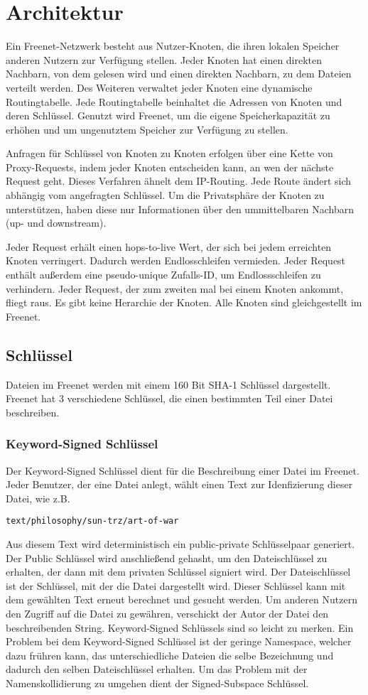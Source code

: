 \section{Architektur}
Ein Freenet-Netzwerk besteht aus Nutzer-Knoten, die ihren lokalen Speicher
anderen Nutzern zur Verfügung stellen. Jeder Knoten hat einen direkten
Nachbarn, von dem gelesen wird und einen direkten Nachbarn, zu dem Dateien
verteilt werden. Des Weiteren verwaltet jeder Knoten eine dynamische
Routingtabelle.  Jede Routingtabelle beinhaltet die Adressen von Knoten und
deren Schlüssel.  Genutzt wird Freenet, um die eigene Speicherkapazität zu
erhöhen und um ungenutztem Speicher zur Verfügung zu stellen.

Anfragen für Schlüssel von Knoten zu Knoten erfolgen über eine Kette von
Proxy-Requests, indem jeder Knoten entscheiden kann, an wen der nächste Request
geht.  Dieses Verfahren ähnelt dem IP-Routing. Jede Route ändert sich abhängig
vom angefragten Schlüssel.  Um die Privatsphäre der Knoten zu unterstützen,
haben diese nur Informationen über den ummittelbaren Nachbarn (up- und
downstream).

Jeder Request erhält einen hops-to-live Wert, der sich bei jedem erreichten
Knoten verringert. Dadurch werden Endlosschleifen vermieden.  Jeder Request
enthält außerdem eine pseudo-unique Zufalls-ID, um Endlossschleifen zu
verhindern. Jeder Request, der zum zweiten mal bei einem Knoten ankommt, fliegt
raus. Es gibt keine Herarchie der Knoten. Alle Knoten sind gleichgestellt im
Freenet.

\subsection{Schlüssel} Dateien im Freenet werden mit einem 160 Bit SHA-1
Schlüssel dargestellt.  Freenet hat 3 verschiedene Schlüssel, die einen
bestimmten Teil einer Datei beschreiben.

\subsubsection{Keyword-Signed Schlüssel} Der Keyword-Signed Schlüssel
dient für die Beschreibung einer Datei im Freenet. Jeder Benutzer, der eine
Datei anlegt, wählt einen Text zur Idenfizierung dieser Datei, wie z.B.
\begin{lstlisting}
text/philosophy/sun-trz/art-of-war
\end{lstlisting}
Aus diesem Text wird deterministisch ein public-private Schlüsselpaar
generiert.  Der Public Schlüssel wird anschließend gehasht, um den
Dateischlüssel zu erhalten, der dann mit dem privaten Schlüssel signiert wird.
Der Dateischlüssel ist der Schlüssel, mit der die Datei dargestellt wird.
Dieser Schlüssel kann mit dem gewählten Text erneut berechnet und gesucht
werden. Um anderen Nutzern den Zugriff auf die Datei zu gewähren, verschickt
der Autor der Datei den beschreibenden String. Keyword-Signed Schlüssels sind
so leicht zu merken. Ein Problem bei dem Keyword-Signed Schlüssel ist der
geringe Namespace, welcher dazu frühren kann, das unterschiedliche Dateien die
selbe Bezeichnung und dadurch den selben Dateischlüssel erhalten. Um das
Problem mit der Namenskollidierung zu umgehen dient der Signed-Subspace
Schlüssel.

